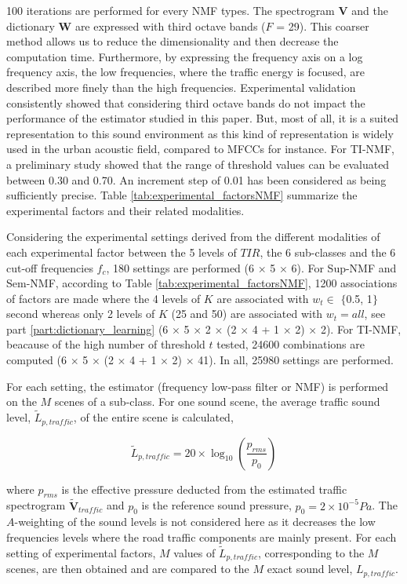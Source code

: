 \documentclass[twocolumn]{svjour3}          %
\begin{document}
100 iterations are performed for every NMF types. The spectrogram $\mathbf{V}$ and the dictionary $\mathbf{W}$ are expressed with third octave bands ($F$ = 29). This coarser method allows us to reduce the dimensionality and then decrease the computation time. Furthermore, by expressing the frequency axis on a log frequency axis, the low frequencies, where the traffic energy is focused, are described more finely than the high frequencies. Experimental validation consistently showed that considering third octave bands do not impact the performance of the estimator studied in this paper. But, most of all, it is a suited representation to this sound environment as this kind of representation is widely used in the urban acoustic field, compared to MFCCs for instance. For TI-NMF, a preliminary study showed that the range of threshold values can be evaluated between 0.30 and 0.70. An increment step of 0.01 has been considered as being sufficiently precise. Table \ref{tab:experimental_factorsNMF} summarize the experimental factors and their related modalities.

Considering the experimental settings derived from the different modalities of each experimental factor  between the 5 levels of $TIR$, the 6 sub-classes and the 6 cut-off frequencies $f_c$, 180 settings are performed (6 $\times$ 5 $\times$ 6). For Sup-NMF and Sem-NMF, according to Table \ref{tab:experimental_factorsNMF},  1200 associations of factors are made where the 4 levels of $K$ are associated with $w_t \in$ $\lbrace$0.5, 1$\rbrace$ second whereas only 2 levels of $K$ (25 and 50) are associated with $w_t = all$, see part \ref{part:dictionary_learning} (6 $\times$ 5 $\times$ 2 $\times$ (2 $\times$ 4 + 1 $\times$ 2) $\times$ 2). For TI-NMF, beacause of the high number of threshold $t$ tested, 24600 combinations are computed (6 $\times$ 5 $\times$ (2 $\times$ 4 + 1 $\times$ 2) $\times$ 41). In all, 25980 settings are performed.

For each setting, the estimator (frequency low-pass filter or NMF) is performed on the $M$ scenes of a sub-class. For one sound scene, the average traffic sound level, $\tilde{L}_{p,traffic}$, of the entire scene is calculated,

\begin{equation}
\tilde{L}_{p,traffic} = 20 \times \log_{10}\left(\frac{p_{rms}}{p_0}\right)
\end{equation}

where $p_{rms}$ is the effective pressure deducted from the estimated traffic spectrogram $\mathbf{\tilde{V}}_{traffic}$ and $p_0$ is the reference sound pressure, $p_0 = 2 \times 10^{-5} Pa$.  The $A$-weighting of the sound levels is not considered here as it decreases the low frequencies levels where the road traffic components are mainly present. For each setting of experimental factors, $M$ values of $\tilde{L}_{p,traffic}$, corresponding to the $M$ scenes, are then obtained and are compared to the $M$ exact sound level, $L_{p,traffic}$.
\end{document}

